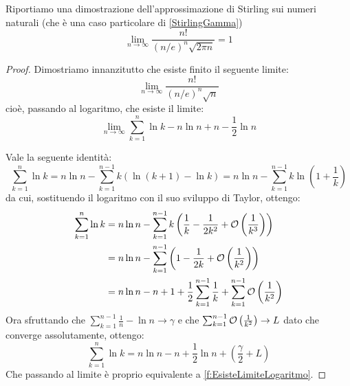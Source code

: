 \begin{theorem}\label{f:StirlingNaturali}
	Riportiamo una dimostrazione dell'approssimazione di Stirling sui numeri naturali (che è una caso
	particolare di \cref{StirlingGamma})
	\begin{equation*}
		\lim_{n\to\infty}{\frac{n!}{(n/e)^n\sqrt{2\pi n}}}=1
	\end{equation*}
\end{theorem}
\begin{proof}
	Dimostriamo innanzitutto che esiste finito il seguente limite:
	\begin{equation}\label{f:EsisteLimite}
		\lim_{n\to\infty}{\frac{n!}{(n/e)^n\sqrt{n}}}
	\end{equation}
	cioè, passando al logaritmo, che esiste il limite:
	\begin{equation}\label{f:EsisteLimiteLogaritmo}
		\lim_{n\to\infty}{\sum_{k=1}^{n}\ln k-n\ln n+n-\frac{1}{2}\ln n}
	\end{equation}
	
	Vale la seguente identità:
	\begin{equation*}
		\sum_{k=1}^{n}\ln k=n\ln n-\sum_{k=1}^{n-1}{k\left(\ln(k+1)-\ln k \right)}=n\ln n-\sum_{k=1}^{n-1}{k\ln\left(1+\frac{1}{k}\right)}
	\end{equation*}
	da cui, sostituendo il logaritmo con il suo sviluppo di Taylor, ottengo:
	\begin{equation*}
	\begin{split}
		\sum_{k=1}^{n}\ln k	& =n\ln n-\sum_{k=1}^{n-1}{k\left(\frac{1}{k}-\frac{1}{2k^2}+\mathcal{O}\left(\frac{1}{k^3}\right) \right)}\\
							& =n\ln n-\sum_{k=1}^{n-1}\left(1-\frac{1}{2k}+\mathcal{O}\left(\frac{1}{k^2}\right)  \right)\\
							& =n\ln n-n+1+\frac{1}{2}\sum_{k=1}^{n-1}\frac{1}{k}+\sum_{k=1}^{n-1}\mathcal{O}\left(\frac{1}{k^2}\right)
	\end{split}
	\end{equation*}
	Ora sfruttando che $\sum_{k=1}^{n-1}\frac{1}{n}-\ln n\to \gamma$ e che $\sum_{k=1}^{n-1}\mathcal{O}\left(\frac{1}{k^2}\right)\to L$
	dato che converge assolutamente, ottengo:
	\begin{equation}\label{f:QuasiStirlingNaturali}
		\sum_{k=1}^{n}\ln k=n\ln n-n+\frac{1}{2}\ln n + (\frac{\gamma}2 + L)
	\end{equation}
	Che passando al limite è proprio equivalente a \cref{f:EsisteLimiteLogaritmo}.
	

\end{proof}
